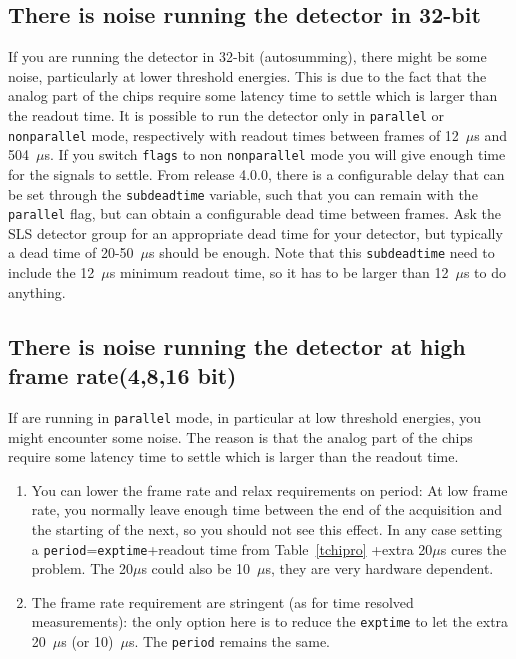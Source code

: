 \documentclass{article}
\begin{document}
\subsection{There is noise running the detector in 32-bit}
If you are running the detector in 32-bit (autosumming), there might be some noise, particularly at lower threshold energies. This is due to the fact that the analog part of the chips require some latency time to settle which is larger than the readout time. It is possible to run the detector only in {\tt{parallel}} or {\tt{nonparallel}} mode, respectively with readout times between frames of 12~$\mu$s and 504~$\mu$s. If you switch {\tt{flags}} to non {\tt{nonparallel}} mode you will give enough time for the signals to settle. From release 4.0.0, there is a configurable delay that can be set through the {\tt{subdeadtime}} variable, such that you can remain with the {\tt{parallel}} flag, but can obtain a configurable dead time between frames. Ask the SLS detector group for an appropriate dead time for your detector, but typically a dead time of 20-50~$\mu$s should be enough. Note that this {\tt{subdeadtime}} need to include the 12~$\mu$s minimum readout time, so it has to be larger than 12~$\mu$s to do anything.  
 
\subsection{There is noise running the detector at high frame rate(4,8,16 bit)}
If are running in {\tt{parallel}} mode, in particular at low threshold energies, you might encounter some noise. The reason is that the analog part of the chips require some latency time to settle which is larger than the readout time. 
\begin{enumerate}
\item You can lower the frame rate and relax requirements on period: 
At low frame rate, you normally leave enough time between the end of the acquisition and the starting of the next, so you should not see this effect. In any case setting a {\tt{period}}={\tt{exptime}}+readout time from Table~\ref{tchipro} +extra 20$\mu$s cures the problem. The 20$\mu$s could also be 10~$\mu$s, they are very hardware dependent.
\item The frame rate requirement are stringent (as for time resolved measurements): the only option here is to reduce the {\tt{exptime}} to let the extra 20~$\mu$s (or 10)~$\mu$s. The {\tt{period}} remains the same.
\end{enumerate} 
 
\end{document}
